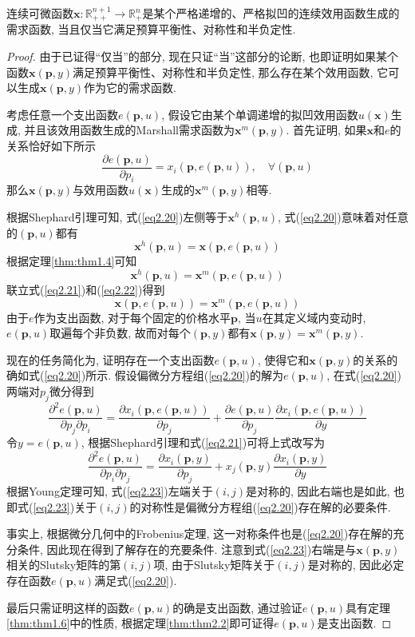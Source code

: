 \documentclass[cn, 12pt, math=mtpro2, bibstyle=apa, blue]{elegantbook}
\newcommand{\R}{\mathbb{R}}
\newcommand{\p}{\mathbf{p}}
\newcommand{\x}{\mathbf{x}}
\begin{document}
\begin{theorem}[可积性定理]
  连续可微函数$\x:\R_{++}^{n+1}\to \R_+^n$是某个严格递增的、严格拟凹的连续效用函数生成的需求函数, 当且仅当它满足预算平衡性、对称性和半负定性.
\end{theorem}
\begin{proof}
  由于已证得“仅当”的部分, 现在只证“当”这部分的论断, 也即证明如果某个函数$\x(\p,y)$满足预算平衡性、对称性和半负定性, 那么存在某个效用函数, 它可以生成$\x(\p,y)$作为它的需求函数.

  考虑任意一个支出函数$e(\p,u)$, 假设它由某个单调递增的拟凹效用函数$u(\x)$生成, 并且该效用函数生成的Marshall需求函数为$\x^m(\p,y)$. 首先证明, 如果$\x$和$e$的关系恰好如下所示
  \begin{equation}\label{eq2.20}
    \frac{\partial e(\p,u)}{\partial p_i}=x_i(\p,e(\p,u)),\quad \forall (\p,u)
  \end{equation}
  那么$\x(\p,y)$与效用函数$u(\x)$生成的$\x^m(\p,y)$相等.

  根据Shephard引理可知, 式(\ref{eq2.20})左侧等于$\x^h(\p,u)$, 式(\ref{eq2.20})意味着对任意的$(\p,u)$都有
  \begin{equation}\label{eq2.21}
    \x^h(\p,u)=\x(\p,e(\p,u))
  \end{equation}
  根据定理\ref{thm:thm1.4}可知
  \begin{equation}\label{eq2.22}
    \x^h(\p,u)=\x^m(\p,e(\p,u))
  \end{equation}
  联立式(\ref{eq2.21})和(\ref{eq2.22})得到
  $$\x(\p,e(\p,u))=\x^m(\p,e(\p,u))$$
  由于$e$作为支出函数, 对于每个固定的价格水平$\p$, 当$u$在其定义域内变动时, $e(\p,u)$取遍每个非负数, 故而对每个$(\p,y)$都有$\x(\p,y)=\x^m(\p,y)$.

  现在的任务简化为, 证明存在一个支出函数$e(\p,u)$, 使得它和$\x(\p,y)$的关系的确如式(\ref{eq2.20})所示. 假设偏微分方程组(\ref{eq2.20})的解为$e(\p,u)$, 在式(\ref{eq2.20})两端对$p_j$微分得到
  $$\frac{\partial^2 e(\p,u)}{\partial p_j\partial p_i}=\frac{\partial x_i(\p,e(\p,u))}{\partial p_j}+\frac{\partial e(\p,u)}{\partial p_j}\frac{\partial x_i(\p,e(\p,u))}{\partial y}$$
  令$y=e(\p,u)$, 根据Shephard引理和式(\ref{eq2.21})可将上式改写为
  \begin{equation}\label{eq2.23}
    \frac{\partial^2e(\p,u)}{\partial p_i\partial p_j}=\frac{\partial x_i(\p,y)}{\partial p_j}+x_j(\p,y)\frac{\partial x_i(\p,y)}{\partial y}
  \end{equation}
  根据Young定理可知, 式(\ref{eq2.23})左端关于$(i,j)$是对称的, 因此右端也是如此, 也即式(\ref{eq2.23})关于$(i,j)$的对称性是偏微分方程组(\ref{eq2.20})存在解的必要条件.

  事实上, 根据微分几何中的Frobenius定理, 这一对称条件也是(\ref{eq2.20})存在解的充分条件, 因此现在得到了解存在的充要条件. 注意到式(\ref{eq2.23})右端是与$\x(\p,y)$相关的Slutsky矩阵的第$(i,j)$项, 由于Slutsky矩阵关于$(i,j)$是对称的, 因此必定存在函数$e(\p,u)$满足式(\ref{eq2.20}).

  最后只需证明这样的函数$e(\p,u)$的确是支出函数, 通过验证$e(\p,u)$具有定理\ref{thm:thm1.6}中的性质, 根据定理\ref{thm:thm2.2}即可证得$e(\p,u)$是支出函数.
\end{proof}
\end{document}
